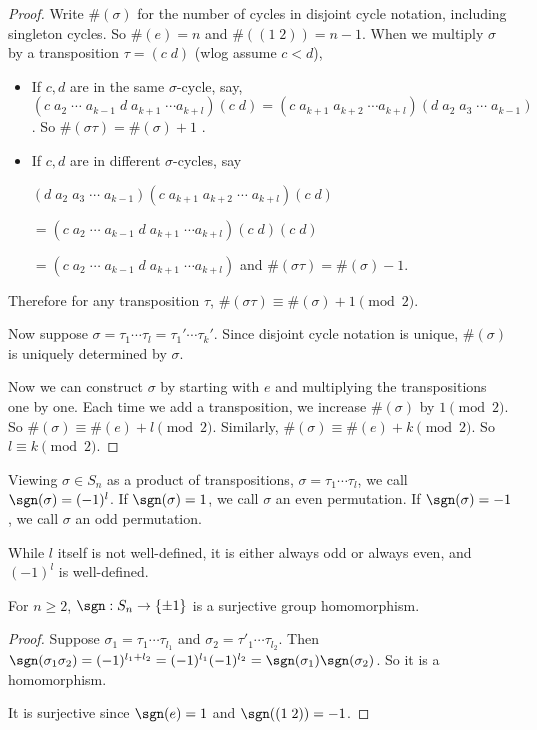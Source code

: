 \documentclass[a4paper]{article}
\begin{document}
\begin{proof}
  Write $\#(\sigma)$ for the number of cycles in disjoint cycle notation, including singleton cycles. So $\#(e) = n$ and $\#((1\; 2)) = n - 1$. When we multiply $\sigma$ by a transposition $\tau = (c\; d)$ (wlog assume $c < d$),
  \begin{itemize}
    \item If $c, d$ are in the same $\sigma$-cycle, say, $(c\; a_2\; \cdots \; a_{k - 1}\; d\; a_{k + 1}\; \cdots a_{k + l})(c\; d) = (c\; a_{k+1}\; a_{k+2}\;\cdots a_{k + l})(d\; a_2\; a_3\;\cdots\; a_{k - 1})$. So $\#(\sigma\tau) = \#(\sigma) + 1$ .
    \item If $c, d$ are in different $\sigma$-cycles, say

      $(d\; a_2\; a_3\;\cdots\;a_{k - 1})(c\; a_{k + 1}\; a_{k + 2}\;\cdots\; a_{k + l})(c\; d) $

      $=(c\; a_2\; \cdots \; a_{k - 1}\; d\; a_{k + 1}\; \cdots a_{k + l})(c\; d)(c\; d)$

      $= (c\; a_2\; \cdots \; a_{k - 1}\; d\; a_{k + 1}\; \cdots a_{k + l})$ and $\#(\sigma\tau) = \#(\sigma) - 1$.

  \end{itemize}
  Therefore for any transposition $\tau$, $\#(\sigma\tau) \equiv \#(\sigma) + 1 \pmod 2$.

  Now suppose $\sigma = \tau_1\cdots\tau_l = \tau_1'\cdots\tau_{k}'$. Since disjoint cycle notation is unique, $\#(\sigma)$ is uniquely determined by $\sigma$.

  Now we can construct $\sigma$ by starting with $e$ and multiplying the transpositions one by one. Each time we add a transposition, we increase $\#(\sigma)$ by $1 \pmod 2$. So $\#(\sigma) \equiv \#(e) + l\pmod 2$. Similarly, $\#(\sigma) \equiv \#(e) + k \pmod 2$. So $l \equiv k \pmod 2$.
\end{proof}

\begin{defi}
  Viewing $\sigma\in S_n$ as a product of transpositions, $\sigma = \tau_1\cdots \tau_l$, we call $\sgn(\sigma) = (-1)^l$. If $\sgn(\sigma) = 1$, we call $\sigma$ an even permutation. If $\sgn(\sigma) = -1$, we call $\sigma$ an odd permutation.
\end{defi}
\note While $l$ itself is not well-defined, it is either always odd or always even, and $(-1)^l$ is well-defined.

\begin{thm}
  For $n\geq 2$, $\sgn : S_n \rightarrow \{\pm 1\}$ is a surjective group homomorphism.
\end{thm}
\begin{proof}
  Suppose $\sigma_1 = \tau_1\cdots \tau_{l_1}$ and $\sigma_2 = \tau'_1\cdots \tau_{l_2}$. Then $\sgn(\sigma_1\sigma_2) = (-1)^{l_1 + l_2} = (-1)^{l_1}(-1)^{l_2} = \sgn(\sigma_1)\sgn(\sigma_2)$. So it is a homomorphism.

  It is surjective since $\sgn(e) = 1$ and $\sgn((1\; 2)) = -1$.
\end{proof}
\end{document}
